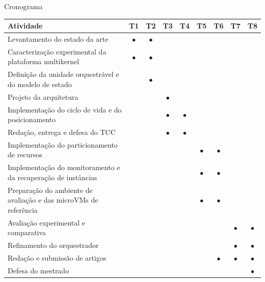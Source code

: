 \documentclass[aspectratio=169]{beamer}
\begin{document}
{%
        \begin{frame}{Cronograma}
            \centering
            \scriptsize
            \renewcommand{\arraystretch}{1.12}
            \setlength{\tabcolsep}{3.5pt}
            \begin{tabular}{p{8.4cm}cccccccc}
                \hline
                \textbf{Atividade} & T1 & T2 & T3 & T4 & T5 & T6 & T7 & T8 \\
                \hline
                Levantamento do estado da arte & $\bullet$ & $\bullet$ &  &  &  &  &  &  \\
                Caracterização experimental da plataforma multikernel & $\bullet$ & $\bullet$ &  &  &  &  &  &  \\
                Definição da unidade orquestrável e do modelo de estado &  & $\bullet$ &  &  &  &  &  &  \\
                Projeto da arquitetura &  &  & $\bullet$ &  &  &  &  &  \\
                Implementação do ciclo de vida e do posicionamento &  &  & $\bullet$ & $\bullet$ &  &  &  &  \\
                Redação, entrega e defesa do TCC &  &  & $\bullet$ & $\bullet$ &  &  &  &  \\
                Implementação do particionamento de recursos &  &  &  &  & $\bullet$ & $\bullet$ &  &  \\
                Implementação do monitoramento e da recuperação de instâncias &  &  &  &  & $\bullet$ & $\bullet$ &  &  \\
                Preparação do ambiente de avaliação e das microVMs de referência &  &  &  &  & $\bullet$ & $\bullet$ &  &  \\
                Avaliação experimental e comparativa &  &  &  &  &  &  & $\bullet$ & $\bullet$ \\
                Refinamento do orquestrador &  &  &  &  &  &  & $\bullet$ & $\bullet$ \\
                Redação e submissão de artigos &  &  &  &  &  & $\bullet$ & $\bullet$ & $\bullet$ \\
                Defesa do mestrado &  &  &  &  &  &  &  & $\bullet$ \\
                \hline
            \end{tabular}
        \end{frame}



    }
\end{document}
